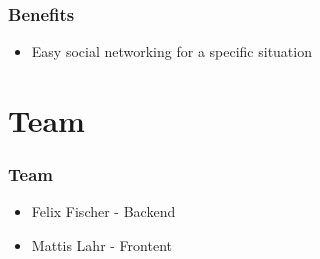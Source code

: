 \documentclass[aspectratio=169]{beamer}
\begin{document}
	\begin{frame}
		\frametitle{Benefits}
		\begin{itemize}
			\item Easy social networking for a specific situation
		\end{itemize}
	\end{frame}

\section{Team}

	\begin{frame}
		\frametitle{Team}
		\begin{itemize}
			\item Felix Fischer - Backend 
			\item Mattis Lahr - Frontent
		\end{itemize}
	\end{frame}
\end{document}
